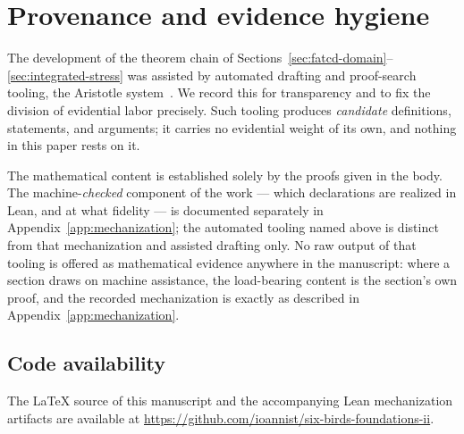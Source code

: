 \section{Provenance and evidence hygiene}\label{app:provenance}


The development of the theorem chain of
Sections~\ref{sec:fatcd-domain}--\ref{sec:integrated-stress} was assisted by
automated drafting and proof-search tooling, the Aristotle
system~\citep{Achim2025Aristotle}. We record this for transparency and to fix the
division of evidential labor precisely. Such tooling produces \emph{candidate}
definitions, statements, and arguments; it carries no evidential weight of its
own, and nothing in this paper rests on it.

The mathematical content is established solely by the proofs given in the body.
The machine-\emph{checked} component of the work --- which declarations are
realized in Lean, and at what fidelity --- is documented separately in
Appendix~\ref{app:mechanization}; the automated tooling named above is distinct
from that mechanization and assisted drafting only. No raw output of that tooling
is offered as mathematical evidence anywhere in the manuscript: where a section
draws on machine assistance, the load-bearing content is the section's own proof,
and the recorded mechanization is exactly as described in
Appendix~\ref{app:mechanization}.

\subsection{Code availability}\label{app:code-availability}

The \LaTeX{} source of this manuscript and the accompanying Lean mechanization
artifacts are available at
\url{https://github.com/ioannist/six-birds-foundations-ii}.
